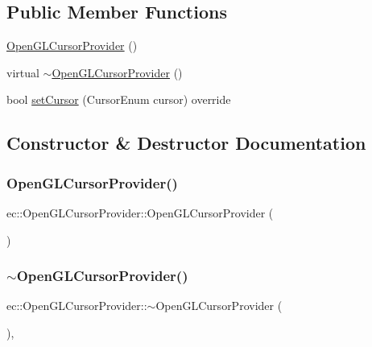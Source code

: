 \subsection*{Public Member Functions}
\begin{DoxyCompactItemize}
\item 
\mbox{\hyperlink{classec_1_1_open_g_l_cursor_provider_ab90d6f1d80ef9da141b4f95870ab0255}{Open\+G\+L\+Cursor\+Provider}} ()
\item 
virtual \mbox{\hyperlink{classec_1_1_open_g_l_cursor_provider_a10f6a4999296f4463062e55339b3cf26}{$\sim$\+Open\+G\+L\+Cursor\+Provider}} ()
\item 
bool \mbox{\hyperlink{classec_1_1_open_g_l_cursor_provider_a1eadfdfdfeaac9f932bad8e16edfab3b}{set\+Cursor}} (Cursor\+Enum cursor) override
\end{DoxyCompactItemize}


\subsection{Constructor \& Destructor Documentation}
\mbox{\label{classec_1_1_open_g_l_cursor_provider_ab90d6f1d80ef9da141b4f95870ab0255}} 
\subsubsection{\texorpdfstring{Open\+G\+L\+Cursor\+Provider()}{OpenGLCursorProvider()}}
{\footnotesize\ttfamily ec\+::\+Open\+G\+L\+Cursor\+Provider\+::\+Open\+G\+L\+Cursor\+Provider (\begin{DoxyParamCaption}{ }\end{DoxyParamCaption})}

\mbox{\label{classec_1_1_open_g_l_cursor_provider_a10f6a4999296f4463062e55339b3cf26}} 
\subsubsection{\texorpdfstring{$\sim$\+Open\+G\+L\+Cursor\+Provider()}{~OpenGLCursorProvider()}}
{\footnotesize\ttfamily ec\+::\+Open\+G\+L\+Cursor\+Provider\+::$\sim$\+Open\+G\+L\+Cursor\+Provider (\begin{DoxyParamCaption}{ }\end{DoxyParamCaption})\hspace{0.3cm}{\ttfamily [virtual]}, {\ttfamily [default]}}



